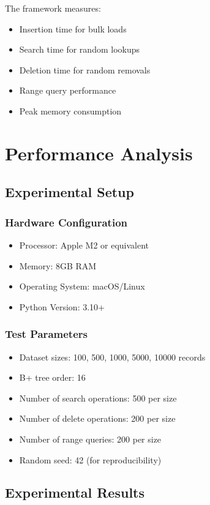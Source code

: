 \documentclass[conference]{IEEEtran}
\begin{document}
The framework measures:
\begin{itemize}
    \item Insertion time for bulk loads
    \item Search time for random lookups
    \item Deletion time for random removals
    \item Range query performance
    \item Peak memory consumption
\end{itemize}

\section{Performance Analysis}

\subsection{Experimental Setup}

\subsubsection{Hardware Configuration}
\begin{itemize}
    \item Processor: Apple M2 or equivalent
    \item Memory: 8GB RAM
    \item Operating System: macOS/Linux
    \item Python Version: 3.10+
\end{itemize}

\subsubsection{Test Parameters}
\begin{itemize}
    \item Dataset sizes: 100, 500, 1000, 5000, 10000 records
    \item B+ tree order: 16
    \item Number of search operations: 500 per size
    \item Number of delete operations: 200 per size
    \item Number of range queries: 200 per size
    \item Random seed: 42 (for reproducibility)
\end{itemize}

\subsection{Experimental Results}
\end{document}
